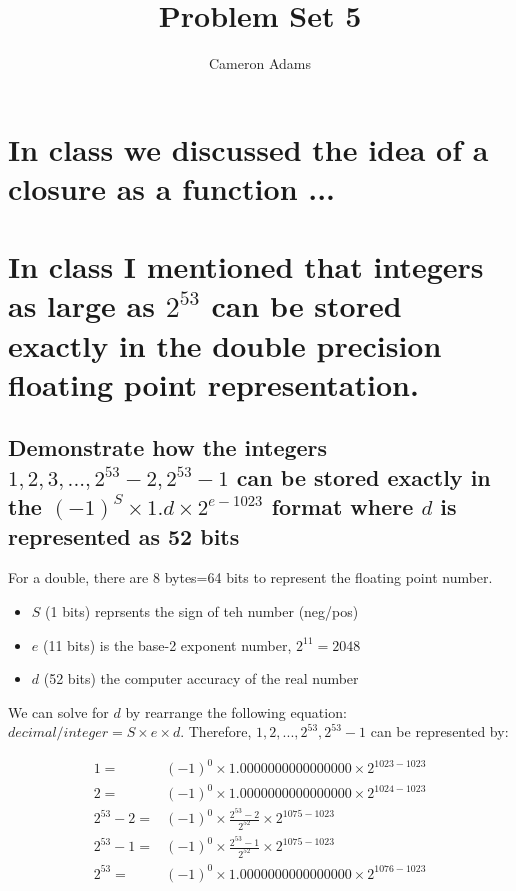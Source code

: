 \documentclass{article}\usepackage[]{graphicx}\usepackage[]{color}
\title{Problem Set 5}
\author{Cameron Adams}
\begin{document}

\maketitle





\section{In class we discussed the idea of a closure as a function ...}
 
\section{In class I mentioned that integers as large as $2^{53}$ can be stored exactly in the double precision floating point representation.}


\subsection{Demonstrate how the integers $1, 2, 3, ...,2^{53} - 2, 2^{53} - 1$ can be stored exactly in the $(−1)^S \times 1.d \times 2^{e−1023}$ format where $d$ is represented as 52 bits}

For a double, there are 8 bytes=64 bits to represent the floating point number.
\begin{itemize}
    \item $S$ (1 bits) reprsents the sign of teh number (neg/pos)
    \item $e$ (11 bits) is the base-2 exponent number, $2^11 = 2048$
    \item $d$ (52 bits) the computer accuracy of the real number
\end{itemize}

We can solve for $d$ by rearrange the following equation: $decimal/integer = S \times e \times d$.
Therefore, $1,2,...,2^{53}, 2^{53}-1$ can be represented by:

$$\begin{aligned}
    1 =& (-1)^0 \times 1.0000000000000000 \times 2^{1023 - 1023} \\
    2 =& (-1)^0 \times 1.0000000000000000 \times 2^{1024 - 1023} \\
    2^{53} - 2 =& (-1)^0 \times \frac{2^{53} - 2}{2^{52}} \times 2^{1075 - 1023}  \\
    2^{53} - 1 =& (-1)^0 \times \frac{2^{53} - 1}{2^{52}} \times 2^{1075 - 1023}  \\
    2^{53} =& (-1)^0 \times 1.0000000000000000 \times 2^{1076 - 1023}  \\
\end{aligned}$$
\end{document}
